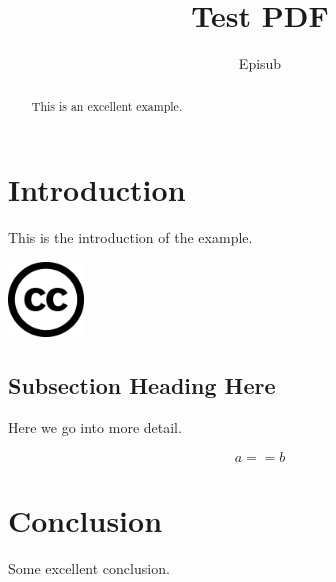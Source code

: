 \documentclass{article}
\begin{document}
\title{Test PDF}
\author{Episub}

\maketitle

\begin{abstract}
This is an excellent example.
\end{abstract}

\section{Introduction}
This is the introduction of the example.

\includegraphics[width=2cm]{logo}

\subsection{Subsection Heading Here}
Here we go into more detail.

\begin{equation}
  a == b
\end{equation}

\section{Conclusion}
Some excellent conclusion.
\end{document}
